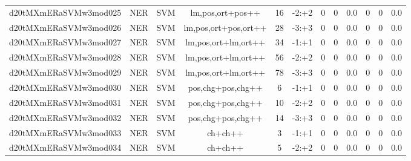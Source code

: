 \documentclass[a4paper]{article}
\begin{document}
\begin{landscape}
\begin{center}
\begin{tabular}{ |c|c|c|c|c|c|c|c|c|c|c|c|}
 
 	
 	\small{ d20tMXmERaSVMw3mod025 } & \small{ NER} & \small{  SVM }  & lm,pos,ort+pos++  &  16 &  \small{  -2:+2 }  &  0 & 0 & 0.0  &  0 & 0 & 0.0 \\
 	

 
 	
 	\small{ d20tMXmERaSVMw3mod026 } & \small{ NER} & \small{  SVM }  & lm,pos,ort+pos,ort++  &  28 &  \small{  -3:+3 }  &  0 & 0 & 0.0  &  0 & 0 & 0.0 \\
 	

 
 	
 	\small{ d20tMXmERaSVMw3mod027 } & \small{ NER} & \small{  SVM }  & lm,pos,ort+lm,ort++  &  34 &  \small{  -1:+1 }  &  0 & 0 & 0.0  &  0 & 0 & 0.0 \\
 	

 
 	
 	\small{ d20tMXmERaSVMw3mod028 } & \small{ NER} & \small{  SVM }  & lm,pos,ort+lm,ort++  &  56 &  \small{  -2:+2 }  &  0 & 0 & 0.0  &  0 & 0 & 0.0 \\
 	

 
 	
 	\small{ d20tMXmERaSVMw3mod029 } & \small{ NER} & \small{  SVM }  & lm,pos,ort+lm,ort++  &  78 &  \small{  -3:+3 }  &  0 & 0 & 0.0  &  0 & 0 & 0.0 \\
 	

 
 	
 	\small{ d20tMXmERaSVMw3mod030 } & \small{ NER} & \small{  SVM }  & pos,chg+pos,chg++  &  6 &  \small{  -1:+1 }  &  0 & 0 & 0.0  &  0 & 0 & 0.0 \\
 	

 
 	
 	\small{ d20tMXmERaSVMw3mod031 } & \small{ NER} & \small{  SVM }  & pos,chg+pos,chg++  &  10 &  \small{  -2:+2 }  &  0 & 0 & 0.0  &  0 & 0 & 0.0 \\
 	

 
 	
 	\small{ d20tMXmERaSVMw3mod032 } & \small{ NER} & \small{  SVM }  & pos,chg+pos,chg++  &  14 &  \small{  -3:+3 }  &  0 & 0 & 0.0  &  0 & 0 & 0.0 \\
 	

 
 	
 	\small{ d20tMXmERaSVMw3mod033 } & \small{ NER} & \small{  SVM }  & ch+ch++  &  3 &  \small{  -1:+1 }  &  0 & 0 & 0.0  &  0 & 0 & 0.0 \\
 	

 
 	
 	\small{ d20tMXmERaSVMw3mod034 } & \small{ NER} & \small{  SVM }  & ch+ch++  &  5 &  \small{  -2:+2 }  &  0 & 0 & 0.0  &  0 & 0 & 0.0 \\
 	


\end{tabular}
\end{center}
\end{landscape}
\end{document}

